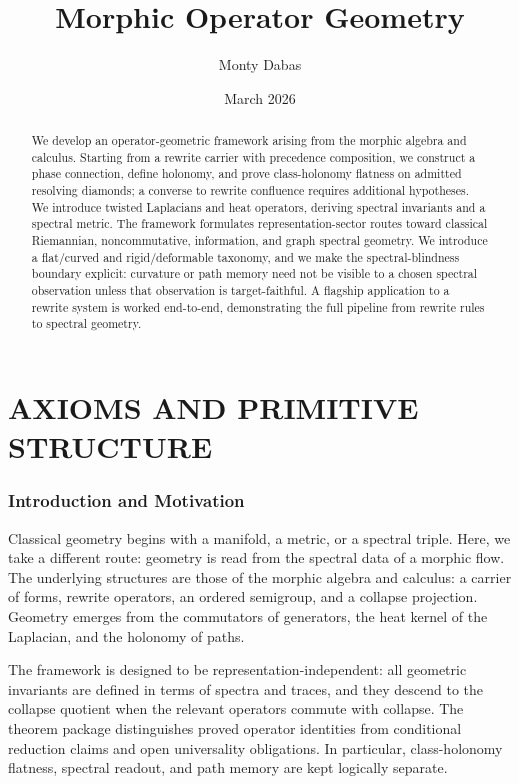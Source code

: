 \documentclass[12pt, oneside]{article}
\title{Morphic Operator Geometry}
\author{Monty Dabas}
\date{March 2026}
\begin{document}
\maketitle

\begin{abstract}
We develop an operator-geometric framework arising from the morphic algebra and calculus. Starting from a rewrite carrier with precedence composition, we construct a phase connection, define holonomy, and prove class-holonomy flatness on admitted resolving diamonds; a converse to rewrite confluence requires additional hypotheses. We introduce twisted Laplacians and heat operators, deriving spectral invariants and a spectral metric. The framework formulates representation-sector routes toward classical Riemannian, noncommutative, information, and graph spectral geometry. We introduce a flat/curved and rigid/deformable taxonomy, and we make the spectral-blindness boundary explicit: curvature or path memory need not be visible to a chosen spectral observation unless that observation is target-faithful. A flagship application to a rewrite system is worked end-to-end, demonstrating the full pipeline from rewrite rules to spectral geometry.
\end{abstract}

\tableofcontents

\newpage

\part{AXIOMS AND PRIMITIVE STRUCTURE}

\section{Introduction and Motivation}

Classical geometry begins with a manifold, a metric, or a spectral triple. Here, we take a different route: geometry is read from the spectral data of a morphic flow. The underlying structures are those of the morphic algebra and calculus: a carrier of forms, rewrite operators, an ordered semigroup, and a collapse projection. Geometry emerges from the commutators of generators, the heat kernel of the Laplacian, and the holonomy of paths.

The framework is designed to be representation-independent: all geometric invariants are defined in terms of spectra and traces, and they descend to the collapse quotient when the relevant operators commute with collapse. The theorem package distinguishes proved operator identities from conditional reduction claims and open universality obligations. In particular, class-holonomy flatness, spectral readout, and path memory are kept logically separate.
\end{document}
